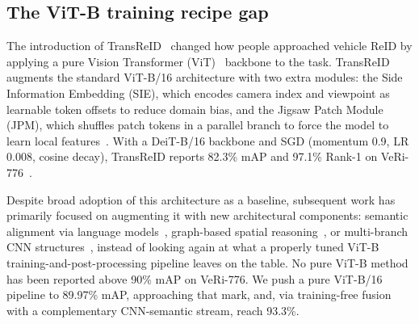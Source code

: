 \subsection{The ViT-B training recipe gap}
The introduction of TransReID~\cite{he2021transreid} changed how people approached
vehicle ReID by applying a pure Vision Transformer
(ViT)~\cite{dosovitskiy2021vit} backbone to the task. TransReID augments the
standard ViT-B/16 architecture with two extra modules: the Side
Information Embedding (SIE), which encodes camera index and viewpoint as
learnable token offsets to reduce domain bias, and the Jigsaw Patch Module
(JPM), which shuffles patch tokens in a parallel branch to force the model to learn local
features~\cite{he2021transreid}. With a DeiT-B/16 backbone and SGD
(momentum 0.9, LR 0.008, cosine decay), TransReID reports 82.3\% mAP and 97.1\%
Rank-1 on VeRi-776~\cite{he2021transreid}.

Despite broad adoption of this architecture as a baseline, subsequent work has
primarily focused on augmenting it with new architectural
components: semantic alignment via language
models~\cite{li2023clipreid,lu2025clipsenet}, graph-based spatial
reasoning~\cite{shen2022hpgn}, or multi-branch CNN
structures~\cite{luo2023mbr4b}, instead of looking again at what a
properly tuned ViT-B training-and-post-processing pipeline leaves on the table.
No pure ViT-B method has been reported above 90\% mAP on VeRi-776. We push a
pure ViT-B/16 pipeline to 89.97\% mAP, approaching that mark, and, via
training-free fusion with a complementary CNN-semantic stream, reach 93.3\%.

